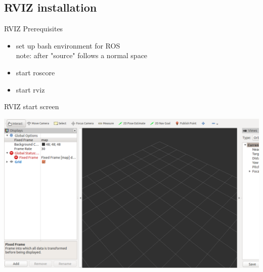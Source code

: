 \documentclass{beamer}
\begin{document}
\subsection{RVIZ installation}
\begin{frame}[fragile]{RVIZ Prerequisites}	

	\begin{itemize}
		\item set up bash environment for ROS \\

			
			note: after "source" follows a normal space	
		
		
		\item start roscore \\
			
			
			
		\item start rviz \\
			
		
	\end{itemize}

\end{frame}





\begin{frame}{RVIZ start screen}	

	\includegraphics[width=\textwidth]{./Images/RVIZ_Start_Screen.png}

\end{frame}
\end{document}
